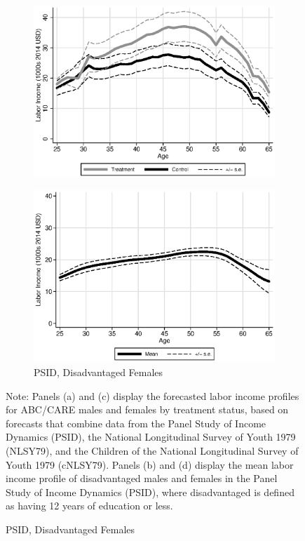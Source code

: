 \begin{figure}
\begin{subfigure}[h]{0.4\textwidth}
		\includegraphics[width=\textwidth]{output/labor_25-60_female.eps}
\end{subfigure}%
\begin{subfigure}[h]{0.4\textwidth}
	\centering
	\caption{PSID, Disadvantaged Females} \label{fig:psid0}
		\includegraphics[width=\textwidth]{output/psid_incomeprofiles_s0.eps}
\end{subfigure}
\footnotesize \justify
Note: Panels (a) and (c) display the forecasted labor income profiles for ABC/CARE males and females by treatment status, based on forecasts that combine data from the Panel Study of Income Dynamics (PSID), the National Longitudinal Survey of Youth 1979 (NLSY79), and the Children of the National Longitudinal Survey of Youth 1979 (cNLSY79). Panels (b) and (d) display the mean labor income profile of disadvantaged males and females in the Panel Study of Income Dynamics (PSID), where disadvantaged is defined as having 12 years of education or less.\\
\end{figure}

